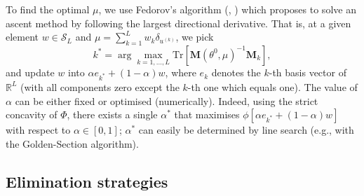 \documentclass[twocolumn]{autart}
\newcommand{\Luc}{\color{magenta} }
\theoremstyle{definition}
\theoremstyle{remark}
\newcommand{\R}{\mathbb{R}}
\newcommand{\Tr}{\mathrm{Tr}}
\newcommand{\Mb}{\mathbf{M}}
\renewcommand{\S}{\mathcal{S}}
\begin{document}
To find the optimal $\mu$, we use Fedorov's algorithm (\cite{Fedorov70}, \cite[Sect.~5.2]{Fedorov72}) which proposes to solve an ascent method by following the largest directional derivative. That is, at a given element $w\in \S_L$ and $\mu = \sum_{k=1}^L w_k\delta_{u^{(k)}}$, we pick
\begin{equation}\label{k*}
k^*=\arg\max_{k=1,\dots, L}  \Tr
\left[
\Mb(\theta^0,\mu)^{-1}
\Mb_k
\right],
\end{equation}
and update $w$ into $\alpha e_{k^*}+(1-\alpha)w$, 
{\Luc where $e_k$ denotes the $k$-th basis vector of $\R^L$ (with all components zero except the $k$-th one which equals one).}
{\Luc The value of $\alpha$ can be either fixed or optimised (numerically). Indeed, using the strict concavity of $\Phi$, there exists a single $\alpha^*$ that maximises $\phi[\alpha e_{k^*}+(1-\alpha)w]$ with respect to $\alpha\in[0,1]$; $\alpha^*$ can easily be determined by line search (e.g., with the Golden-Section algorithm).}  

\subsection{Elimination strategies}\label{S:elimination}
\end{document}
